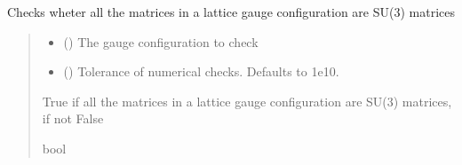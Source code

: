 \documentclass[letterpaper,10pt,english]{sphinxmanual}
\begin{document}
\begin{fulllineitems}
\label{\detokenize{gauge_su3:gauge_su3.conf_est_SU3}}
\pysigstartsignatures
\pysiglinewithargsret
{}
{\sphinxparamcomma {}}
{}
\pysigstopsignatures
\sphinxAtStartPar
Checks wheter all the matrices in a lattice gauge configuration are SU(3) matrices
\begin{quote}\begin{description}
\begin{itemize}
\item {} 
\sphinxAtStartPar
{} () \textendash{} The gauge configuration to check

\item {} 
\sphinxAtStartPar
{} (\sphinxstyleliteralemphasis{\sphinxupquote{, }}) \textendash{} Tolerance of numerical checks. Defaults to 1e\sphinxhyphen{}10.

\end{itemize}

\sphinxAtStartPar
True if all the matrices in a lattice gauge configuration are SU(3) matrices, if not False

\sphinxAtStartPar
bool

\end{description}\end{quote}

\end{fulllineitems}

\end{document}
